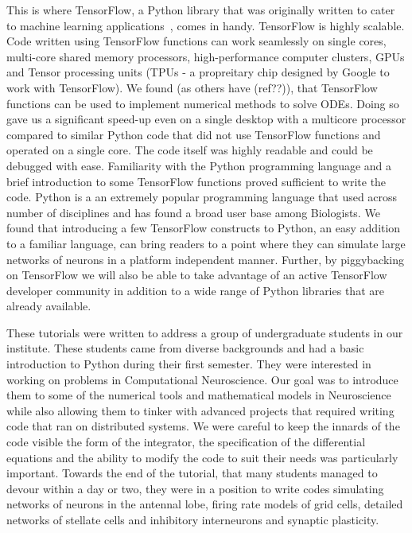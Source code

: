 \documentclass[10pt,letterpaper]{article}
\begin{document}
This is where TensorFlow, a Python library that was originally written to cater to machine learning applications~\cite{}, comes in handy. TensorFlow is highly scalable. Code written using TensorFlow functions can work seamlessly on single cores, multi-core shared memory processors, high-performance computer clusters, GPUs and Tensor processing units (TPUs - a propreitary chip designed by Google to work with TensorFlow). We found (as others have (ref??)), that TensorFlow functions can be used to implement numerical methods to solve ODEs. Doing so gave us a significant speed-up even on a single desktop with a multicore processor compared to similar Python code that did not use TensorFlow functions and operated on a single core. The code itself was highly readable and could be debugged with ease. Familiarity with the Python programming language and a brief introduction to some TensorFlow functions proved sufficient to write the code. Python is a an extremely popular programming language that used across number of disciplines and has found a broad user base among Biologists. We found that introducing a few TensorFlow constructs to Python, an easy addition to a familiar language, can bring readers to a point where they can simulate large networks of neurons in a platform independent manner. Further, by piggybacking on TensorFlow we will also be able to take advantage of an active TensorFlow developer community in addition to a wide range of Python libraries that are already available. 

These tutorials were written to address a group of undergraduate students in our institute. These students came from diverse backgrounds and had a basic introduction to Python during their first semester. They were interested in working on problems in Computational Neuroscience. Our goal was to introduce them to some of the numerical tools and mathematical models in Neuroscience while also allowing them to tinker with advanced projects that required writing code that ran on distributed systems. We were careful to keep the innards of the code visible \textemdash the form of the integrator, the specification of the differential equations and the ability to modify the code to suit their needs was particularly important. Towards the end of the tutorial, that many students managed to devour within a day or two, they were in a position to write codes simulating networks of neurons in the antennal lobe, firing rate models of grid cells, detailed networks of stellate cells and inhibitory interneurons and synaptic plasticity. 
\end{document}
